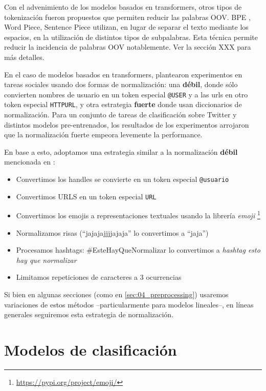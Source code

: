 Con el advenimiento de los modelos basados en transformers, otros tipos de tokenización fueron propuestos que permiten reducir las palabras OOV. BPE \cite{sennrich2016neural}, Word Piece, Sentence Piece \cite{kudo-richardson-2018-sentencepiece} utilizan, en lugar de separar el texto mediante los espacios, en la utilización de distintos tipos de subpalabras. Esta técnica permite reducir la incidencia de palabras OOV notablemente. Ver la sección XXX para más detalles. 

En el caso de modelos basados en transformers, \citet{bertweet} plantearon experimentos en tareas sociales usando dos formas de normalización: una \textbf{débil}, donde sólo convierten nombres de usuario en un token especial \verb|@USER| y a las urls en otro token especial \verb|HTTPURL|, y otra estrategia \textbf{fuerte} donde usan diccionarios de normalización. Para un conjunto de tareas de clasificación sobre Twitter y distintos modelos pre-entrenados, los resultados de los experimentos arrojaron que la normalización fuerte empeora levemente la performance.

En base a esto, adoptamos una estrategia similar a la normalización \textbf{débil} mencionada en \citet{bertweet}:

\begin{itemize}
    \item  Convertimos los handles se convierte en un token especial \verb|@usuario|
    \item Convertimos URLS en un token especial \verb|URL|
    \item Convertimos los emojis a representaciones textuales usando la librería \emph{emoji} \footnote{\url{https://pypi.org/project/emoji/}}
    \item Normalizamos risas (``jajajajjjjajaja'' lo convertimos a ``jaja'')
    \item Procesamos hashtags: \#EsteHayQueNormalizar lo convertimos a \emph{hashtag esto hay que normalizar}
    \item Limitamos repeticiones de caracteres a 3 ocurrencias
\end{itemize}

Si bien en algunas secciones (como en \ref{sec:04_preprocessing}) usaremos variaciones de estos métodos --particularmente para modelos lineales--, en líneas generales seguiremos esta estrategia de normalización.

\section{Modelos de clasificación}
\label{sec:03_classification}

